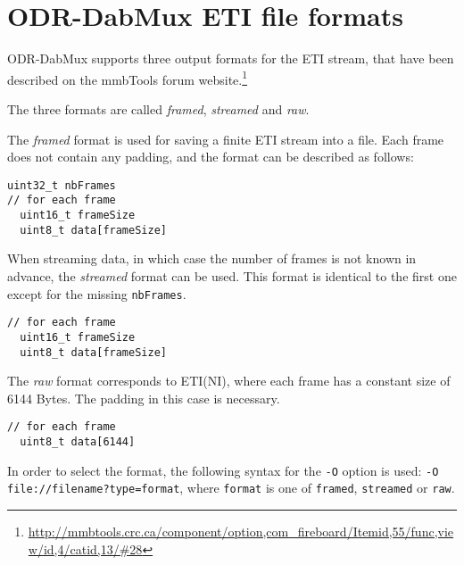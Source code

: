 
\section{ODR-DabMux ETI file formats}
\label{etiformat}
ODR-DabMux supports three output formats for the ETI stream, that have been described on the mmbTools forum
website.\footnote{\url{http://mmbtools.crc.ca/component/option,com\_fireboard/Itemid,55/func,view/id,4/catid,13/\#28}}

The three formats are called \emph{framed}, \emph{streamed} and \emph{raw}.

The \emph{framed} format is used for saving a finite ETI stream into a file. Each frame does not contain any padding, and the
format can be described as follows:
\begin{lstlisting}
uint32_t nbFrames
// for each frame
  uint16_t frameSize
  uint8_t data[frameSize]
\end{lstlisting}

When streaming data, in which case the number of frames is not known in advance, the \emph{streamed} format can be used.
This format is identical to the first one except for the missing \texttt{nbFrames}.
\begin{lstlisting}
// for each frame
  uint16_t frameSize
  uint8_t data[frameSize]
\end{lstlisting}

The \emph{raw} format corresponds to ETI(NI), where each frame has a constant size of 6144 Bytes. The padding in this
case is necessary.
\begin{lstlisting}
// for each frame
  uint8_t data[6144]
\end{lstlisting}

In order to select the format, the following syntax for the \texttt{-O} option is used:
\texttt{-O file://filename?type=format}, where \texttt{format} is one of \verb+framed+, \verb+streamed+ or
\verb+raw+.


